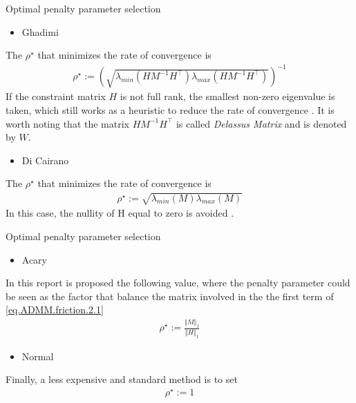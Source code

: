 \documentclass[8pt,red]{beamer}
\theoremstyle{plain}
\theoremstyle{definition}
\theoremstyle{remark}
\begin{document}
\begin{frame}{Optimal penalty parameter selection}

\begin{itemize}
\item Ghadimi
\end{itemize}
The $\rho^{\star}$ that minimizes the rate of convergence is
\begin{align}
  \rho^{\star} := \left(\sqrt{\lambda_{min}(H M^{-1} H^{\top}) \lambda_{max}(H M^{-1} H^{\top})}\right) ^{-1} 
\end{align}
If the constraint matrix $H$ is not full rank, the smallest non-zero eigenvalue is taken, which still works as a heuristic to reduce the rate of convergence \citep{ghadimi2015optimal}. It is worth noting that the matrix $H M^{-1} H^{\top}$ is called \textit{Delassus Matrix} and is denoted by $W$.

\begin{itemize}
\item Di Cairano
\end{itemize}
The $\rho^{\star}$ that minimizes the rate of convergence is
\begin{align}
  \rho^{\star} := \sqrt{\lambda_{min}(M) \lambda_{max}(M)}
\end{align}
In this case, the nullity of H equal to zero is avoided \citep{raghunathan2014alternating}.
\end{frame}

\begin{frame}{Optimal penalty parameter selection}

\begin{itemize}
\item Acary
\end{itemize}
In this report is proposed the following value, where the penalty parameter could be seen as the factor that balance the matrix involved in the the first term of \eqref{eq.ADMM.friction.2.1}
\begin{align}
  \rho^{\star} := \frac{\Vert M \Vert_{1}}{\Vert H \Vert_{1}}
\end{align}

\begin{itemize}
\item Normal
\end{itemize}
Finally, a less expensive and standard method is to set
\begin{align}
  \rho^{\star} := 1
\end{align}
\end{frame}
\end{document}
